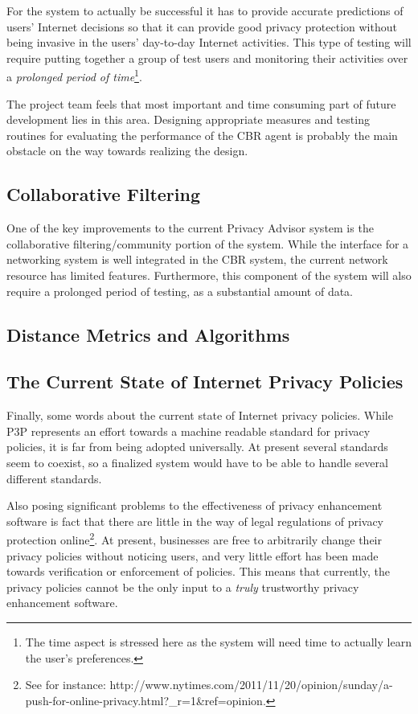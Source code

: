 For the system to actually be successful it has to provide accurate predictions
of users' Internet decisions so that it can provide good privacy protection
without being invasive in the users' day-to-day Internet activities. This type
of testing will require putting together a group of test users and monitoring their
activities over a \emph{prolonged period of time}\footnote{The time aspect is stressed here
as the system will need time to actually learn the user's preferences.}. 

The project team feels that most important and time consuming part of future development lies
in this area. Designing appropriate measures and testing routines for evaluating the performance
of the CBR agent is probably the main obstacle on the way towards realizing the design.

\subsection{Collaborative Filtering} %
One of the key improvements to the current Privacy Advisor system is the
collaborative filtering/community portion of the system. While the interface
for a networking system is well integrated in the CBR system, the current 
network resource has limited features. Furthermore, this component of the system
will also require a prolonged period of testing, as a substantial amount of data.


\subsection{Distance Metrics and Algorithms}


\subsection{The Current State of Internet Privacy Policies}
Finally, some words about the current state of Internet privacy policies. While P3P represents
an effort towards a machine readable standard for privacy policies, it is far from being adopted
universally. At present several standards seem to coexist, so a finalized system would have to
be able to handle several different standards.

Also posing significant problems to the effectiveness of privacy enhancement software is fact 
that there are little in the way of legal regulations of privacy protection online\footnote{See for instance:
http://www.nytimes.com/2011/11/20/opinion/sunday/a-push-for-online-privacy.html?_r=1&ref=opinion.}.
At present, businesses are free to arbitrarily change their privacy policies without noticing users,
and very little effort has been made towards verification or enforcement of policies. This means that currently,
the privacy policies cannot be the only input to a \emph{truly} trustworthy privacy enhancement software.


